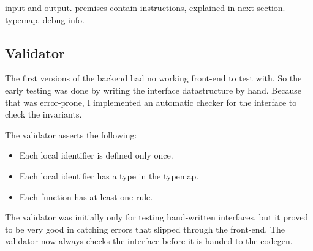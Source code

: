 input and output.
premises contain instructions, explained in next section.
typemap.
debug info.

\subsection{Validator}
The first versions of the backend had no working front-end to test with.
So the early testing was done by writing the interface datastructure by hand.
Because that was error-prone, I implemented an automatic checker for the interface to check the invariants.

The validator asserts the following:
\begin{itemize}
\item Each local identifier is defined only once.
\item Each local identifier has a type in the typemap.
\item Each function has at least one rule.
\end{itemize}

The validator was initially only for testing hand-written interfaces,
but it proved to be very good in catching errors that slipped through the front-end.
The validator now always checks the interface before it is handed to the codegen.

